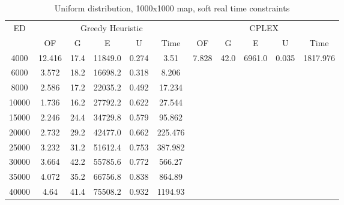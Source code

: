 \begin{table}[htb]
	\centering
	\begin{tabular}{|c|c|c|c|c|c|c|c|c|c|c|}
		\hline
		\multirow{2}{*}{ED} & \multicolumn{5}{c|}{Greedy Heuristic} & \multicolumn{5}{c|}{CPLEX}\\ 
		\cline{2-11}
& OF & G & E & U & Time & OF & G & E & U & Time\\ 
		\hline
		4000 & 12.416 & 17.4 & 11849.0 & 0.274 & 3.51 & 7.828 & 42.0 & 6961.0 & 0.035 & 1817.976 \\ 
		6000 & 3.572 & 18.2 & 16698.2 & 0.318 & 8.206 & & & & &  \\ 
		8000 & 2.586 & 17.2 & 22035.2 & 0.492 & 17.234 & & & & &  \\ 
		10000 & 1.736 & 16.2 & 27792.2 & 0.622 & 27.544 & & & & &  \\ 
		15000 & 2.246 & 24.4 & 34729.8 & 0.579 & 95.862 & & & & &  \\ 
		20000 & 2.732 & 29.2 & 42477.0 & 0.662 & 225.476 & & & & &  \\ 
		25000 & 3.232 & 31.2 & 51612.4 & 0.753 & 387.982 & & & & &  \\ 
		30000 & 3.664 & 42.2 & 55785.6 & 0.772 & 566.27 & & & & &  \\ 
		35000 & 4.072 & 35.2 & 66756.8 & 0.838 & 864.89 & & & & &  \\ 
		40000 & 4.64 & 41.4 & 75508.2 & 0.932 & 1194.93 & & & & &  \\ 
		\hline 
	\end{tabular} 
	\caption{Uniform distribution, 1000x1000 map, soft real time constraints} 
	\label{tab:unif_soft_n_esc_1000} 
\end{table} 

